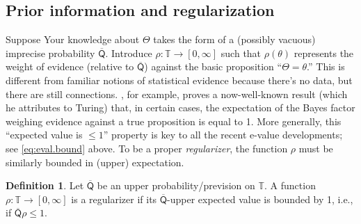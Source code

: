 \documentclass[a4paper, 12pt]{article}
\theoremstyle{plain}
\theoremstyle{definition}
\newtheorem{defn}{Definition}
\theoremstyle{remark}
\newcommand{\TT}{\mathbb{T}}
\newcommand{\uprior}{\overline{\mathsf{Q}}}
\begin{document}



\subsection{Prior information and regularization}

Suppose Your knowledge about $\Theta$ takes the form of a (possibly vacuous) imprecise probability $\uprior$.  Introduce $\rho: \TT \to [0,\infty]$ such that $\rho(\theta)$ represents the weight of evidence (relative to $\uprior$) against the basic proposition ``$\Theta=\theta$.''  This is different from familiar notions of statistical evidence because there's no data, but there are still connections.  \citet[][Ch.~6.7]{good.evidence.book}, for example, proves a now-well-known result (which he attributes to Turing) that, in certain cases, the expectation of the Bayes factor weighing evidence against a true proposition is equal to 1.  More generally, this ``expected value is $\leq 1$'' property is key to all the recent e-value developments; see \eqref{eq:eval.bound} above.  To be a proper {\em regularizer}, the function $\rho$ must be similarly bounded in (upper) expectation.

\begin{defn}
\label{def:regularizer}
Let $\uprior$ be an upper probability/prevision on $\TT$.  A function $\rho: \TT \to [0,\infty]$ is a regularizer if its $\uprior$-upper expected value is bounded by 1, i.e., if $\uprior \rho \leq 1$. 
\end{defn}
\end{document}
